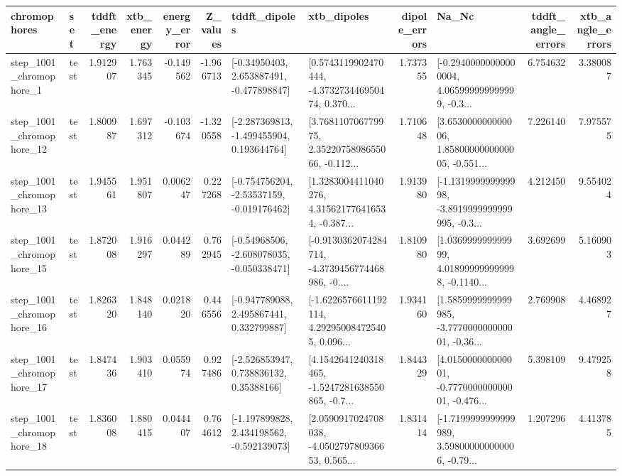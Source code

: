 \begin{tabular}{llrrrrllrlrr}
\toprule
             chromophores &       set &  tddft\_energy &  xtb\_energy &  energy\_error &  Z\_values &                               tddft\_dipoles &                                        xtb\_dipoles &  dipole\_errors &                                              Na\_Nc &  tddft\_angle\_errors &  xtb\_angle\_errors \\
\midrule
  step\_1001\_chromophore\_1 &      test &      1.912907 &    1.763345 &     -0.149562 & -1.966713 &    [-0.34950403, 2.653887491, -0.477898847] &  [0.5743119902470444, -4.373273446950474, 0.370... &       1.737355 &  [-0.29400000000000004, 4.065999999999999, -0.3... &            6.754632 &          3.380087 \\
 step\_1001\_chromophore\_12 &      test &      1.800987 &    1.697312 &     -0.103674 & -1.320558 &   [-2.287369813, -1.499455904, 0.193644764] &  [3.768110706779975, 2.3522075898655066, -0.112... &       1.710648 &  [3.653000000000006, 1.8580000000000005, -0.551... &            7.226140 &          7.975575 \\
 step\_1001\_chromophore\_13 &      test &      1.945561 &    1.951807 &      0.006247 &  0.227268 &   [-0.754756204, -2.53537159, -0.019176462] &  [1.3283004411040276, 4.315621776416534, -0.387... &       1.913980 &  [-1.131999999999998, -3.8919999999999995, -0.3... &            4.212450 &          9.554024 \\
 step\_1001\_chromophore\_15 &      test &      1.872008 &    1.916297 &      0.044289 &  0.762945 &   [-0.54968506, -2.608078035, -0.050338471] &  [-0.9130362074284714, -4.3739456774468986, -0.... &       1.810980 &  [1.036999999999999, 4.018999999999998, -0.1140... &            3.692699 &          5.160903 \\
 step\_1001\_chromophore\_16 &      test &      1.826320 &    1.848140 &      0.021820 &  0.446556 &    [-0.947789088, 2.495867441, 0.332799887] &  [-1.6226576611192114, 4.292950084725405, 0.096... &       1.934160 &  [1.5859999999999985, -3.777000000000001, -0.36... &            2.769908 &          4.468927 \\
 step\_1001\_chromophore\_17 &      test &      1.847436 &    1.903410 &      0.055974 &  0.927486 &     [-2.526853947, 0.738836132, 0.35388166] &  [4.1542641240318465, -1.5247281638550865, -0.7... &       1.844329 &  [4.015000000000001, -0.777000000000001, -0.476... &            5.398109 &          9.479258 \\
 step\_1001\_chromophore\_18 &      test &      1.836008 &    1.880415 &      0.044407 &  0.764612 &   [-1.197899828, 2.434198562, -0.592139073] &  [2.0590917024708038, -4.050279780936653, 0.565... &       1.831414 &  [-1.7199999999999989, 3.598000000000006, -0.79... &            1.207296 &          4.413785 \\

\end{tabular}
